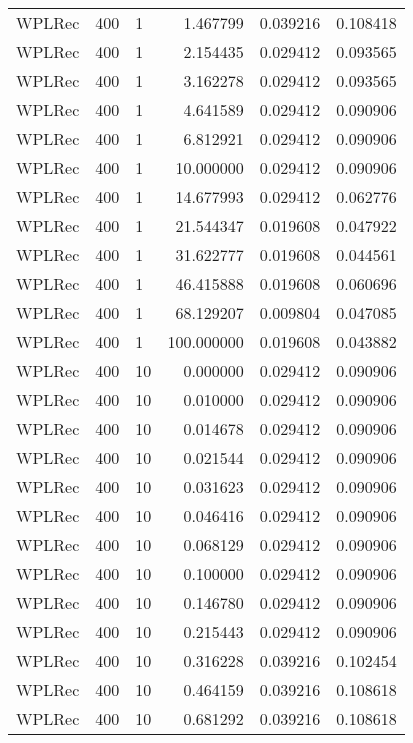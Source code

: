 \begin{tabular}{lllrrr}
 WPLRec &  400 &      1 &    1.467799 &     0.039216 &  0.108418 \\
 WPLRec &  400 &      1 &    2.154435 &     0.029412 &  0.093565 \\
 WPLRec &  400 &      1 &    3.162278 &     0.029412 &  0.093565 \\
 WPLRec &  400 &      1 &    4.641589 &     0.029412 &  0.090906 \\
 WPLRec &  400 &      1 &    6.812921 &     0.029412 &  0.090906 \\
 WPLRec &  400 &      1 &   10.000000 &     0.029412 &  0.090906 \\
 WPLRec &  400 &      1 &   14.677993 &     0.029412 &  0.062776 \\
 WPLRec &  400 &      1 &   21.544347 &     0.019608 &  0.047922 \\
 WPLRec &  400 &      1 &   31.622777 &     0.019608 &  0.044561 \\
 WPLRec &  400 &      1 &   46.415888 &     0.019608 &  0.060696 \\
 WPLRec &  400 &      1 &   68.129207 &     0.009804 &  0.047085 \\
 WPLRec &  400 &      1 &  100.000000 &     0.019608 &  0.043882 \\
 WPLRec &  400 &     10 &    0.000000 &     0.029412 &  0.090906 \\
 WPLRec &  400 &     10 &    0.010000 &     0.029412 &  0.090906 \\
 WPLRec &  400 &     10 &    0.014678 &     0.029412 &  0.090906 \\
 WPLRec &  400 &     10 &    0.021544 &     0.029412 &  0.090906 \\
 WPLRec &  400 &     10 &    0.031623 &     0.029412 &  0.090906 \\
 WPLRec &  400 &     10 &    0.046416 &     0.029412 &  0.090906 \\
 WPLRec &  400 &     10 &    0.068129 &     0.029412 &  0.090906 \\
 WPLRec &  400 &     10 &    0.100000 &     0.029412 &  0.090906 \\
 WPLRec &  400 &     10 &    0.146780 &     0.029412 &  0.090906 \\
 WPLRec &  400 &     10 &    0.215443 &     0.029412 &  0.090906 \\
 WPLRec &  400 &     10 &    0.316228 &     0.039216 &  0.102454 \\
 WPLRec &  400 &     10 &    0.464159 &     0.039216 &  0.108618 \\
 WPLRec &  400 &     10 &    0.681292 &     0.039216 &  0.108618 \\

\end{tabular}
